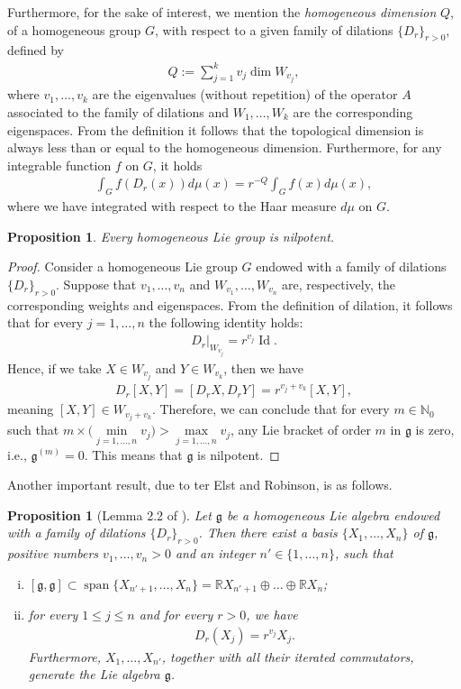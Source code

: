 \documentclass[12pt,oneside,a4paper]{book}
\numberwithin{equation}{section}     %
\theoremstyle{plain}
\newtheorem{proposition}[theorem]{Proposition}
\theoremstyle{definition}
\DeclareMathOperator{\Id}{Id}
\DeclareMathOperator{\SPAN}{span}
\newcommand{\N}{{\mathbb N}}
\newcommand{\R}{{\mathbb R}}
\begin{document}
Furthermore, for the sake of interest, we mention the \textit{homogeneous dimension} $Q$, of a homogeneous group $G$, with respect to a given family of dilations $\{D_r\}_{r>0}$, defined by
\begin{align*}
Q:=\sum_{j=1}^{k}v_j\dim W_{v_j},
\end{align*}
where $v_1,\dots,v_k$ are the eigenvalues (without repetition) of the operator $A$ associated to the family of dilations and $W_1,\dots,W_k$ are the corresponding eigenspaces. From the definition it follows that the topological dimension is always less than or equal to the homogeneous dimension. Furthermore, for any integrable function $f$ on $G$, it holds
\begin{align}\label{integrationdilation}
\int_G f(D_r(x))d\mu(x)=r^{-Q}\int_Gf(x)d\mu(x),
\end{align}
where we have integrated with respect to the Haar measure $d\mu$ on $G$. 
\begin{proposition}\label{nilpotent}
	Every homogeneous Lie group is nilpotent.
\end{proposition}
\begin{proof}
	Consider a homogeneous Lie group $G$ endowed with a family of dilations $\{D_r\}_{r>0}$. Suppose that $v_1,\dots,v_n$ and $W_{v_1},\dots,W_{v_n}$ are, respectively, the corresponding weights and eigenspaces. From the definition of dilation, it follows that for every $j=1,\dots,n$ the following identity holds:
	\begin{align*}
	D_r\bigr|_{W_{v_j}}=r^{v_j}\Id.  
	\end{align*}
	Hence, if we take $X\in W_{v_j}$ and $Y\in W_{v_k}$, then we have
	\begin{align*}
	D_r[X,Y]=[D_r X, D_r Y]=r^{v_j+v_k}[X,Y],
	\end{align*}
	meaning $[X,Y] \in W_{v_j+v_k}$. Therefore, we can conclude that for every $m\in\N_0$ such that $m\times\big(\min\limits_{j=1,\dots,n} v_j\big)>\max\limits_{j=1,\dots,n} v_j$, any Lie bracket of order $m$ in $\mathfrak{g}$ is zero, i.e., $\mathfrak{g}^{(m)}=0$. This means that $\mathfrak{g}$ is nilpotent.
\end{proof}
Another important result, due to ter Elst and Robinson, is as follows.
\begin{proposition}[Lemma 2.2 of \cite{tER:97}]\label{adapted basis}
	Let $\mathfrak{g}$ be a homogeneous Lie algebra endowed with a family of dilations $\{D_r\}_{r>0}$. Then there exist a basis $\{X_1,\dots, X_n\}$ of $\mathfrak{g}$, positive numbers $v_1,\dots,v_n>0$ and an integer $n'\in\{1,\dots,n\}$, such that 
	\begin{enumerate}[i.]
		\item $[\mathfrak{g},\mathfrak{g}]\subset \SPAN\{X_{n'+1},\dots,X_n\}=\R X_{n'+1}\oplus\dots\oplus\R X_{n}$;
		\item for every $1\leq j\leq n$ and for every $r>0$, we have
		\begin{align}\label{basisofeigenvectors}
		D_r(X_j)=r^{v_j}X_j.
		\end{align}
		Furthermore, $X_1,\dots,X_{n'}$, together with all their iterated commutators, generate the Lie algebra $\mathfrak{g}$.
	\end{enumerate}
\end{proposition}
\end{document}
